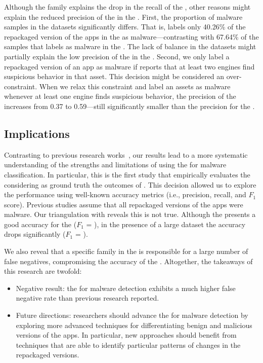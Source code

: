 Although the \gps family explains the drop in the recall of the \mas, other  reasons might explain the reduced precision of the \mas in the \cds. First, the proportion of malware samples in the
datasets significantly differs. That is, \vt labels only 40.26\% of the repackaged version of the apps in the \cds as malware---contrasting with 67.64\% of the samples that \vt labels as malware in the \sds. The lack of balance in the datasets might partially explain the low precision of the \mas in the \cds. Second, we only label a repackaged version of an app as malware if \vt reports that at least two engines find suspicious behavior in that asset. This decision might be considered an over-constraint. When we relax this constraint and label an assets as malware whenever at least one engine finds suspicious behavior, the precision of the \mas increases from 0.37 to 0.59---still significantly smaller than the \mas precision for the \sds.

\subsection{Implications}\label{sec:implications} 

Contrasting to previous research works~\cite{DBLP:conf/wcre/BaoLL18,DBLP:conf/iceccs/LeB0GL18,DBLP:journals/jss/CostaMMSSBNR22},
our results 
lead to a more systematic understanding
of the strengths and limitations of using the \mas
for malware classification. In particular, this is the
first study that empirically evaluates the \mas
considering as ground truth the outcomes
of \vt. This decision allowed us to explore the
\mas performance using well-known accuracy metrics (i.e., precision, recall, and
$F_1$ score). Previous studies assume that all repackaged versions of the
apps were malware. Our triangulation with \vt reveals this is not true. Although
the \mas presents a good accuracy for the \sds ($F_1$ = \fscoreSmall), 
in the presence of a large dataset the \mas accuracy drops significantly ($F_1$ = \fscore). 

We also reveal that a specific family in the \cds is responsible for a large number of false negatives,
compromising the accuracy of the \mas.
Altogether, the takeaways of this research are twofold:

\begin{itemize}
  \item Negative result: the \mas for malware detection exhibits a much higher false negative rate than previous research reported. 

  \item Future directions: researchers should advance the \mas for malware detection by exploring more advanced
    techniques for differentiating benign and malicious versions of the apps. In particular, new approaches should benefit from techniques
    that are able to identify particular patterns of changes in the repackaged versions. 
\end{itemize}  



